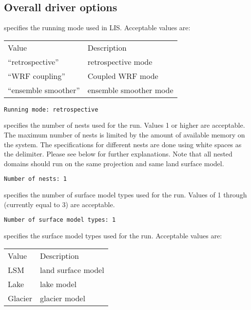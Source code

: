  

 
 \subsection{Overall driver options} \label{ssec:driveropts}
 

 
  specifies the running mode used in LIS.
 Acceptable values are:
 \begin{tabular}{ll}
 Value                    & Description                \\
 ``retrospective''        & retrospective mode         \\
 ``WRF coupling''         & Coupled WRF mode           \\
 ``ensemble smoother''    & ensemble smoother mode     \\
 \end{tabular}
 

 \begin{Verbatim}[frame=single]
Running mode: retrospective
 \end{Verbatim}


 
  specifies the number of nests used for the run. 
 Values 1 or higher are acceptable. The maximum number of nests is
 limited by the amount of available memory on the system. 
 The specifications for different nests are done using white spaces 
 as the delimiter. Please see below for further explanations. Note 
 that all nested domains should run on the same projection and same 
 land surface model.
 

 \begin{Verbatim}[frame=single]
Number of nests: 1
 \end{Verbatim}

 
  specifies the number of surface
 model types used for the run. 
 Values of 1 through 
 (currently equal to 3)
 are acceptable.
 

 \begin{Verbatim}[frame=single]
Number of surface model types: 1
 \end{Verbatim}

 
  specifies the surface model types
 used for the run. 
 Acceptable values are:

 \begin{tabular}{ll}
 Value   &  Description        \\
 LSM     & land surface model  \\
 Lake    & lake model          \\
 Glacier & glacier model       \\
 \end{tabular}
 


